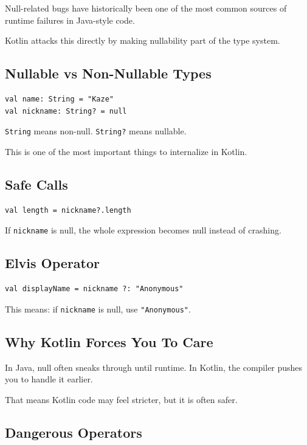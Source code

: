 \documentclass[11pt,a4paper]{article}
\begin{document}
Null-related bugs have historically been one of the most common sources of runtime failures in Java-style code.

Kotlin attacks this directly by making nullability part of the type system.

\subsection{Nullable vs Non-Nullable Types}

\begin{lstlisting}[style=kazekotlin]
val name: String = "Kaze"
val nickname: String? = null
\end{lstlisting}

\texttt{String} means non-null.
\texttt{String?} means nullable.

This is one of the most important things to internalize in Kotlin.

\subsection{Safe Calls}

\begin{lstlisting}[style=kazekotlin]
val length = nickname?.length
\end{lstlisting}

If \texttt{nickname} is null, the whole expression becomes null instead of crashing.

\subsection{Elvis Operator}

\begin{lstlisting}[style=kazekotlin]
val displayName = nickname ?: "Anonymous"
\end{lstlisting}

This means: if \texttt{nickname} is null, use \texttt{"Anonymous"}.

\subsection{Why Kotlin Forces You To Care}

In Java, null often sneaks through until runtime.
In Kotlin, the compiler pushes you to handle it earlier.

That means Kotlin code may feel stricter, but it is often safer.

\subsection{Dangerous Operators}
\end{document}
